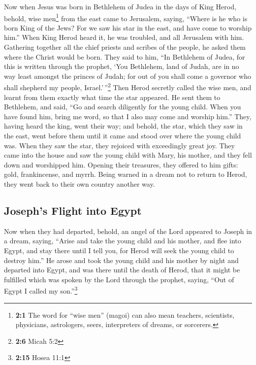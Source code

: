  Now when Jesus was born in Bethlehem of Judea in the days
of King Herod, behold, wise men\footnote{\textbf{2:1} The word for
  ``wise men'' (magoi) can also mean teachers, scientists, physicians,
  astrologers, seers, interpreters of dreams, or sorcerers.} from the
east came to Jerusalem, saying,  ``Where is he who is born
King of the Jews? For we saw his star in the east, and have come to
worship him.''  When King Herod heard it, he was troubled,
and all Jerusalem with him.  Gathering together all the
chief priests and scribes of the people, he asked them where the Christ
would be born.  They said to him, ``In Bethlehem of Judea,
for this is written through the prophet,  `You Bethlehem,
land of Judah, are in no way least amongst the princes of Judah; for out
of you shall come a governor who shall shepherd my people,
Israel.'\,''\footnote{\textbf{2:6} Micah 5:2}  Then Herod
secretly called the wise men, and learnt from them exactly what time the
star appeared.  He sent them to Bethlehem, and said, ``Go
and search diligently for the young child. When you have found him,
bring me word, so that I also may come and worship him.'' 
They, having heard the king, went their way; and behold, the star, which
they saw in the east, went before them until it came and stood over
where the young child was.  When they saw the star, they
rejoiced with exceedingly great joy.  They came into the
house and saw the young child with Mary, his mother, and they fell down
and worshipped him. Opening their treasures, they offered to him gifts:
gold, frankincense, and myrrh.  Being warned in a dream
not to return to Herod, they went back to their own country another way.

\hypertarget{josephs-flight-into-egypt}{%
\subsection{Joseph's Flight into
Egypt}\label{josephs-flight-into-egypt}}

 Now when they had departed, behold, an angel of the Lord
appeared to Joseph in a dream, saying, ``Arise and take the young child
and his mother, and flee into Egypt, and stay there until I tell you,
for Herod will seek the young child to destroy him.''  He
arose and took the young child and his mother by night and departed into
Egypt,  and was there until the death of Herod, that it
might be fulfilled which was spoken by the Lord through the prophet,
saying, ``Out of Egypt I called my son.''\footnote{\textbf{2:15} Hosea
  11:1}

